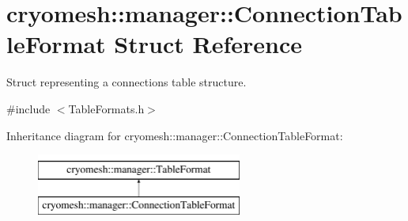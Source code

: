 \hypertarget{structcryomesh_1_1manager_1_1ConnectionTableFormat}{\section{cryomesh\-:\-:manager\-:\-:\-Connection\-Table\-Format \-Struct \-Reference}
\label{structcryomesh_1_1manager_1_1ConnectionTableFormat}
}


\-Struct representing a connections table structure.  




{\ttfamily \#include $<$\-Table\-Formats.\-h$>$}

\-Inheritance diagram for cryomesh\-:\-:manager\-:\-:\-Connection\-Table\-Format\-:\begin{figure}[H]
\begin{center}
\leavevmode
\includegraphics[height=2.000000cm]{structcryomesh_1_1manager_1_1ConnectionTableFormat}
\end{center}
\end{figure}
